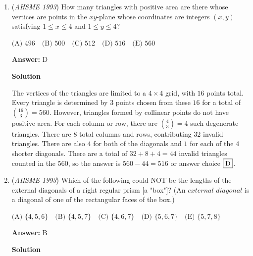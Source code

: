 \begin{enumerate}
 Since the smaller triangle is also a $6-8-10 = 3-4-5$ triangle, we can label the sides $EF,$ $CE,$ and $DF$ as $3x, 4x,$ and $5x$ respectively. Now, it is clear that $GB = DE + 1 = 4x + 1$, so $AH = AG = 8 - GB = 7 - 4x$ since $AH$ and $AG$ are both tangent to the circle P at some point. We can apply the same logic to the other side as well to get $CI = 5 - 3x$. Finally, since we have $HI = DF = 5x$, we have $AC = 10 = (7 - 4x) + (5x) + (5 - 3x) = 12 - 2x$, so $x = 1$ and $3x + 4x + 5x = \fbox{(B) 12}$

 -Solution by Someonenumber011

 


	\item (\textit{AHSME 1993}) How many triangles with positive area are there whose vertices are points in the $xy$-plane whose coordinates are integers $(x,y)$ satisfying $1\le x\le 4$ and $1\le y\le 4$?


 $\text{(A) } 496\quad \text{(B) } 500\quad \text{(C) } 512\quad \text{(D) } 516\quad \text{(E) } 560$

 \textbf{Answer: }D



\textbf{Solution}

The vertices of the triangles are limited to a $4\times4$ grid, with $16$ points total. Every triangle is determined by $3$ points chosen from these $16$ for a total of $\binom{16}{3}=560$. However, triangles formed by collinear points do not have positive area. For each column or row, there are $\binom{4}{3}=4$ such degenerate triangles. There are $8$ total columns and rows, contributing $32$ invalid triangles. There are also $4$ for both of the diagonals and $1$ for each of the $4$ shorter diagonals. There are a total of $32+8+4=44$ invalid triangles counted in the $560$, so the answer is $560-44=516$ or answer choice $\fbox{D}$.

 


	\item (\textit{AHSME 1993}) Which of the following could NOT be the lengths of the external diagonals of a right regular prism [a "box"]? (An $\textit{external diagonal}$ is a diagonal of one of the rectangular faces of the box.)


 $\text{(A) }\{4,5,6\} \quad \text{(B) } \{4,5,7\} \quad \text{(C) } \{4,6,7\} \quad \text{(D) } \{5,6,7\} \quad \text{(E) } \{5,7,8\}$

 \textbf{Answer: }B



\textbf{Solution}


\end{enumerate}
